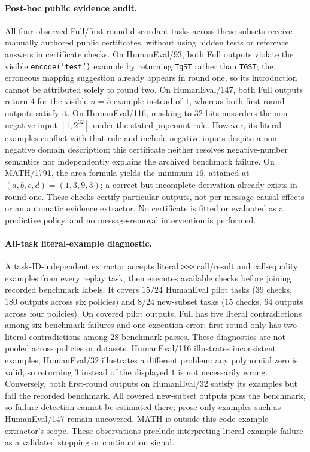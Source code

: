 \documentclass[11pt,twoside,twocolumn,letterpaper]{article}
\begin{document}
\paragraph{Post-hoc public evidence audit.} All four observed Full/first-round discordant tasks across these subsets receive manually authored public certificates, without using hidden tests or reference answers in certificate checks. On HumanEval/93, both Full outputs violate the visible \texttt{encode('test')} example by returning \texttt{TgST} rather than \texttt{TGST}; the erroneous mapping suggestion already appears in round one, so its introduction cannot be attributed solely to round two. On HumanEval/147, both Full outputs return $4$ for the visible $n=5$ example instead of $1$, whereas both first-round outputs satisfy it. On HumanEval/116, masking to $32$ bits misorders the non-negative input $[1,2^{32}]$ under the stated popcount rule. However, its literal examples conflict with that rule and include negative inputs despite a non-negative domain description; this certificate neither resolves negative-number semantics nor independently explains the archived benchmark failure. On MATH/1791, the area formula yields the minimum $16$, attained at $(a,b,c,d)=(1,3,9,3)$; a correct but incomplete derivation already exists in round one. These checks certify particular outputs, not per-message causal effects or an automatic evidence extractor. No certificate is fitted or evaluated as a predictive policy, and no message-removal intervention is performed.

\paragraph{All-task literal-example diagnostic.} A task-ID-independent extractor accepts literal \texttt{>>>} call/result and call-equality examples from every replay task, then executes available checks before joining recorded benchmark labels. It covers $15/24$ HumanEval pilot tasks ($39$ checks, $180$ outputs across six policies) and $8/24$ new-subset tasks ($15$ checks, $64$ outputs across four policies). On covered pilot outputs, Full has five literal contradictions among six benchmark failures and one execution error; first-round-only has two literal contradictions among $28$ benchmark passes. These diagnostics are not pooled across policies or datasets. HumanEval/116 illustrates inconsistent examples; HumanEval/32 illustrates a different problem: any polynomial zero is valid, so returning $3$ instead of the displayed $1$ is not necessarily wrong. Conversely, both first-round outputs on HumanEval/32 satisfy its examples but fail the recorded benchmark. All covered new-subset outputs pass the benchmark, so failure detection cannot be estimated there; prose-only examples such as HumanEval/147 remain uncovered. MATH is outside this code-example extractor's scope. These observations preclude interpreting literal-example failure as a validated stopping or continuation signal.
\end{document}
